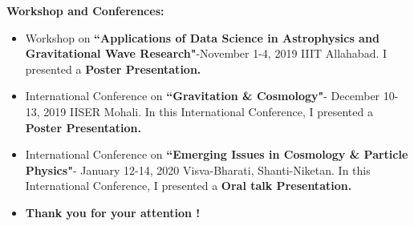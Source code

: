 \documentclass[xcolor=table,bigger]{beamer}
\begin{document}
{\1
\begin{frame}
 
 {\color{blue}\Large \textbf{Workshop and Conferences:}}
 
\vspace{3mm}
  \begin{itemize}
 \item[\ding{74}]
Workshop on \textbf{``Applications of Data Science in Astrophysics and Gravitational Wave Research"}-November 1-4, 2019 IIIT Allahabad. I presented a \textbf{Poster Presentation.}
\vspace{3mm}\\
\item[\ding{74}]
International Conference on \textbf{``Gravitation \& Cosmology"}- December 10-13, 2019 IISER Mohali. In this International Conference, I presented a \textbf{Poster Presentation.}
\vspace{3mm}\\
\item[\ding{74}]
International Conference on \textbf{``Emerging Issues in Cosmology \& Particle Physics"}- January 12-14, 2020 Visva-Bharati, Shanti-Niketan. In this International Conference, I presented a \textbf{Oral talk Presentation.}
\vspace{8mm}\\
\item[]
\begin{center}
\textbf{Thank you for your attention !}
\end{center}
\end{itemize}
\end{frame}}
\end{document}
